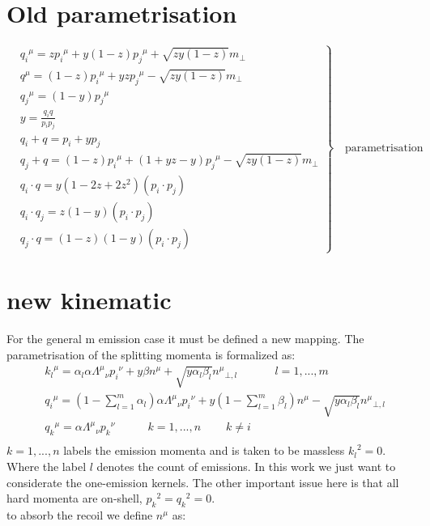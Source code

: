 \section{Old parametrisation}

	
\begin{equation}
	\left.\begin{aligned}
	&{q_i}^{\mu} = z{p_i}^{\mu} + y(1-z){p_j}^{\mu} + \sqrt{zy(1-z)}{m}_{\bot} \\
	&{q}^{\mu}   = (1-z){p_i}^{\mu} + yz {p_j}^{\mu} - \sqrt{zy(1-z)}{m}_{\bot} \\
	&{q_j}^{\mu} = (1-y) {p_j}^{\mu} \\
		&y       = \frac{q_i q}{p_i p_j} \\
&q_i +q      = p_i + yp_j \\
&q_j +q      = (1-z){p_i}^{\mu} + (1+yz-y) {p_j}^{\mu} - \sqrt{zy(1-z)}{m}_{\bot}\\
&q_i \cdot q = y(1-2z+2z^2)(p_i \cdot p_j)\\
&q_i \cdot q_j = z(1-y) (p_i \cdot p_j)\\
&q_j \cdot q = (1-z)(1-y) (p_i \cdot p_j)
		\end{aligned}
	\right\}
	\quad \text{parametrisation}
\end{equation}


\section{new kinematic}
For the general m emission case it must be defined a new mapping. The parametrisation of the splitting momenta is formalized as:
\begin{equation}
	\begin{split}
	&{k_l}^{\mu} = \alpha_l \alpha {\Lambda^{\mu}}_{\nu}{p_i}^{\nu} + y\beta{n}^{\mu} + \sqrt{y\alpha_l\beta_l}{n^{\mu}}_{\bot,l} \:\:\:\:\:\:\:\:\:\:\:\:\:\:\:{l=1,...,m} \\
	&{q_i}^{\mu}   = (1-\displaystyle\sum\limits_{l=1}^m \alpha_l) \alpha {\Lambda^{\mu}}_{\nu}{p_i}^{\nu} + y(1-\displaystyle\sum\limits_{l=1}^m \beta_l){n}^{\mu} - \sqrt{y\alpha_l\beta_l}{n^{\mu}}_{\bot,l} \\
	&{q_k}^{\mu} = \alpha {\Lambda^{\mu}}_{\nu}{p_k}^{\nu} \:\:\:\:\:\:\:\:\:\:\:\:\: {k=1,...,n}\:\:\:\:\:\:\:\:\:\:k\neq i\\
    \end{split}
\end{equation}
$ k = 1,...,n $ labels the emission momenta and is taken to be massless $ {k_l}^2 = 0 $. Where the label $ l $ denotes the count of emissions. In this work we just want to considerate the one-emission kernels. The other important issue here is that all hard momenta are on-shell, $ {p_k}^2={q_k}^2=0 $.\\
to absorb the recoil we define $ n^{\mu} $ as:

